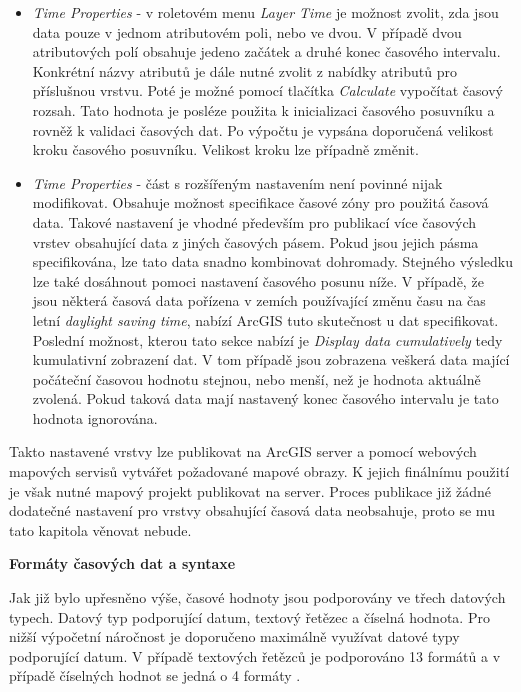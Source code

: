 \begin{itemize}
	\item \textit{Time Properties} - v roletovém menu
\textit{Layer Time} je možnost zvolit, zda jsou data pouze v jednom
atributovém poli, nebo ve dvou. V případě dvou atributových polí 
obsahuje jedeno začátek a druhé konec časového intervalu. 
Konkrétní názvy atributů je dále nutné
zvolit z nabídky atributů pro příslušnou vrstvu. 
Poté je možné pomocí tlačítka \textit{Calculate}
vypočítat časový rozsah. Tato hodnota je posléze použita k
inicializaci časového posuvníku a rovněž k validaci časových dat. Po
výpočtu je vypsána doporučená velikost kroku časového posuvníku. Velikost
kroku lze případně změnit.
	
	\item \textit{Time Properties} - část s rozšířeným nastavením
není povinné nijak modifikovat. Obsahuje možnost specifikace časové
zóny pro použitá časová data. Takové nastavení je vhodné především pro
publikací více časových vrstev obsahující data z jiných časových
pásem. Pokud jsou jejich pásma specifikována, lze tato data snadno
kombinovat dohromady. Stejného výsledku lze také dosáhnout pomoci
nastavení časového posunu níže. V případě, že jsou některá časová data
pořízena v zemích používající změnu času na čas letní \textit{daylight
saving time}, nabízí ArcGIS tuto skutečnost u dat
specifikovat. Poslední možnost, kterou tato sekce nabízí je
\textit{Display data cumulatively} tedy kumulativní zobrazení dat. V
tom případě jsou zobrazena veškerá data mající počáteční časovou
hodnotu stejnou, nebo menší, než je hodnota aktuálně zvolená. Pokud taková data
mají nastavený konec časového intervalu je tato hodnota ignorována.
\end{itemize}

Takto nastavené vrstvy lze publikovat na ArcGIS server a pomocí
webových mapových servisů vytvářet požadované mapové obrazy. K jejich
finálnímu použití je však nutné mapový projekt publikovat na
server. Proces publikace již žádné dodatečné nastavení pro vrstvy
obsahující časová data neobsahuje, proto se mu tato kapitola věnovat
nebude.

\bigskip
\noindent \textbf{Formáty časových dat a syntaxe}

Jak již bylo upřesněno výše, časové hodnoty jsou podporovány ve třech datových
typech. Datový typ podporující datum, textový řetězec a číselná
hodnota. Pro nižší výpočetní náročnost je doporučeno maximálně využívat 
datové typy podporující datum. V případě textových řetězců je
podporováno 13 formátů a v případě číselných hodnot se jedná o 4
formáty \cite{arcgiq-data-types}.

